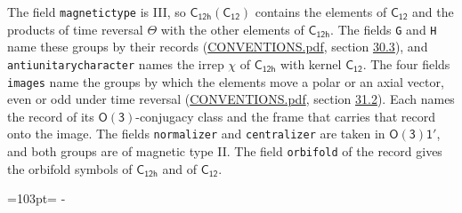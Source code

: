\documentclass[10pt,a4paper]{article}
\newcommand{\needspace}[1]{\par\penalty-100\begingroup\dimen0=#1\relax\dimen2=\pagegoal
  \advance\dimen2-\pagetotal\ifdim\dimen0>\dimen2\relax\ifdim\dimen2>0pt\vfil\break\fi\fi
  \endgroup}
\numberwithin{equation}{section}
\newcommand{\grp}[1]{\mathsf{#1}}
\begin{document}
The field \texttt{magnetictype} is III, so $\grp{C_{12h}}(\grp{C_{12}})$ contains the elements of $\grp{C_{12}}$ and the products of time reversal $\varTheta$ with the other elements of $\grp{C_{12h}}$. The fields \texttt{G} and \texttt{H} name these groups by their records (\href{../../CONVENTIONS.pdf}{CONVENTIONS.pdf}, section \href{../../CONVENTIONS.pdf\#conv.30.3}{30.3}), and \texttt{antiunitarycharacter} names the irrep $\chi$ of $\grp{C_{12h}}$ with kernel $\grp{C_{12}}$. The four fields \texttt{images} name the groups by which the elements move a polar or an axial vector, even or odd under time reversal (\href{../../CONVENTIONS.pdf}{CONVENTIONS.pdf}, section \href{../../CONVENTIONS.pdf\#conv.31.2}{31.2}). Each names the record of its $\grp{O(3)}$-conjugacy class and the frame that carries that record onto the image. The fields \texttt{normalizer} and \texttt{centralizer} are taken in $\grp{O(3)1'}$, and both groups are of magnetic type II. The field \texttt{orbifold} of the record gives the orbifold symbols of $\grp{C_{12h}}$ and of $\grp{C_{12}}$.
\needspace{103pt}
\end{document}
